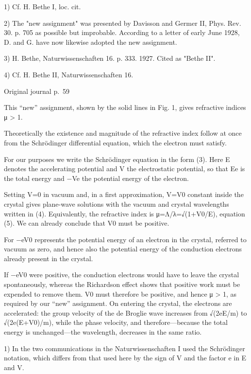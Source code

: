 \documentclass[10pt]{article}
\newcommand{\origpage}[1]{\par\medskip\noindent\hfill{\small\color{notegray}Original journal p.~#1}\hfill\mbox{}\par\smallskip}
\begin{document}
\noindent\footnotesize 1) Cf. H. Bethe I, loc. cit.\par\normalsize
\noindent\footnotesize 2) The "new assignment" was presented by Davisson and Germer II, Phys. Rev. 30. p. 705 as possible but improbable. According to a letter of early June 1928, D. and G. have now likewise adopted the new assignment.\par\normalsize
\noindent\footnotesize 3) H. Bethe, Naturwissenschaften 16. p. 333. 1927. Cited as "Bethe II".\par\normalsize
\noindent\footnotesize 4) Cf. H. Bethe II, Naturwissenschaften 16.\par\normalsize
\origpage{59}
This “new” assignment, shown by the solid lines in Fig. 1, gives refractive indices μ > 1.\par
Theoretically the existence and magnitude of the refractive index follow at once from the Schrödinger differential equation, which the electron must satisfy.\par
For our purposes we write the Schrödinger equation in the form (3). Here E denotes the accelerating potential and V the electrostatic potential, so that Ee is the total energy and −Ve the potential energy of the electron.\par
Setting V=0 in vacuum and, in a first approximation, V=V0 constant inside the crystal gives plane-wave solutions with the vacuum and crystal wavelengths written in (4). Equivalently, the refractive index is μ=Λ/λ=√(1+V0/E), equation (5). We can already conclude that V0 must be positive.\par
For −eV0 represents the potential energy of an electron in the crystal, referred to vacuum as zero, and hence also the potential energy of the conduction electrons already present in the crystal.\par
If −eV0 were positive, the conduction electrons would have to leave the crystal spontaneously, whereas the Richardson effect shows that positive work must be expended to remove them. V0 must therefore be positive, and hence μ > 1, as required by our “new” assignment. On entering the crystal, the electrons are accelerated: the group velocity of the de Broglie wave increases from √(2eE/m) to √(2e(E+V0)/m), while the phase velocity, and therefore—because the total energy is unchanged—the wavelength, decreases in the same ratio.\par
\noindent\footnotesize 1) In the two communications in the Naturwissenschaften I used the Schrödinger notation, which differs from that used here by the sign of V and the factor e in E and V.\par\normalsize
\end{document}
